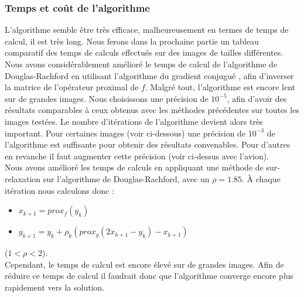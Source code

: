 \subsubsection{Temps et coût de l'algorithme}
L'algorithme semble être très efficace, malheureusement en termes de temps de calcul, il est très long. Nous ferons dans la prochaine partie un tableau comparatif des temps de calculs effectués sur des images de tailles différentes.\\
Nous avons considérablement amélioré le temps de calcul de l'algorithme de Douglas-Rachford en utilisant l'algorithme du gradient conjugué \cite{Gradient}, afin d'inverser la matrice de l'opérateur proximal de $f$. Malgré tout, l'algorithme est encore lent sur de grandes images. Nous choisissons une précision de $10^{-5}$, afin d'avoir des résultats comparables à ceux obtenus avec les méthodes précédentes sur toutes les images testées. Le nombre d'itérations de l'algorithme devient alors très important. Pour certaines images (voir ci-dessous) une précision de $10^{-3}$ de l'algorithme est suffisante pour obtenir des résultats convenables. Pour d'autres en revanche il faut augmenter cette précision (voir ci-dessus avec l'avion).\\
Nous avons amélioré les temps de calculs en appliquant une méthode de sur-relaxation sur l'algorithme de Douglas-Rachford, avec un $\rho  =1.85$. À chaque itération nous calculons donc :
\begin{center} 
\begin{itemize}
\item $x_{k+1} = prox_f(y_k)$
\item $y_{k+1} = y_k+\rho_k(prox_g(2x_{k+1}-y_k)-x_{k+1})$
\end{itemize}
\end{center}
($1<\rho<2$).\\
Cependant, le temps de calcul est encore élevé sur de grandes images.
Afin de réduire ce temps de calcul il faudrait donc que l'algorithme converge encore plus rapidement vers la solution. 
